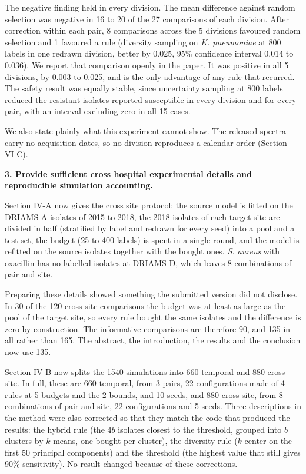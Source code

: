\documentclass[11pt,a4paper]{article}
\newcommand{\pt}[1]{\textbf{#1}}
\begin{document}
The negative finding held in every division. The mean difference against random selection was negative in 16 to 20
of the 27 comparisons of each division. After correction within each pair, 8 comparisons across the 5 divisions
favoured random selection and 1 favoured a rule (diversity sampling on \textit{K. pneumoniae} at 800 labels in one
redrawn division, better by 0.025, 95\% confidence interval 0.014 to 0.036). We report that comparison openly in the
paper. It was positive in all 5 divisions, by 0.003 to 0.025, and is the only advantage of any rule that recurred. The
safety result was equally stable, since uncertainty sampling at 800 labels reduced the resistant isolates reported
susceptible in every division and for every pair, with an interval excluding zero in all 15 cases.

We also state plainly what this experiment cannot show. The released spectra carry no acquisition dates, so no
division reproduces a calendar order (Section VI-C).

\pt{3. Provide sufficient cross hospital experimental details and reproducible simulation accounting.}

Section IV-A now gives the cross site protocol: the source model is fitted on the DRIAMS-A isolates of 2015 to 2018,
the 2018 isolates of each target site are divided in half (stratified by label and redrawn for every seed) into a pool
and a test set, the budget (25 to 400 labels) is spent in a single round, and the model is refitted on the source
isolates together with the bought ones. \textit{S. aureus} with oxacillin has no labelled isolates at DRIAMS-D, which
leaves 8 combinations of pair and site.

Preparing these details showed something the submitted version did not disclose. In 30 of the 120 cross site
comparisons the budget was at least as large as the pool of the target site, so every rule bought the same isolates and
the difference is zero by construction. The informative comparisons are therefore 90, and 135 in all rather than 165.
The abstract, the introduction, the results and the conclusion now use 135.

Section IV-B now splits the 1540 simulations into 660 temporal and 880 cross site. In full, these are 660 temporal, from 3 pairs, 22 configurations made of 4
rules at 5 budgets and the 2 bounds, and 10 seeds, and 880 cross site, from 8 combinations of pair and site, 22
configurations and 5 seeds. Three descriptions in the method were also corrected so that they match the code that
produced the results: the hybrid rule (the $4b$ isolates closest to the threshold, grouped into $b$ clusters by
$k$-means, one bought per cluster), the diversity rule ($k$-center on the first 50 principal components) and the
threshold (the highest value that still gives 90\% sensitivity). No result changed because of these corrections.
\end{document}
